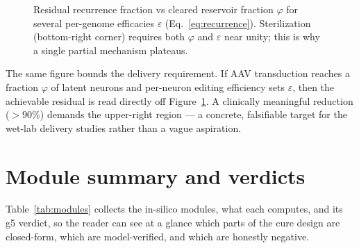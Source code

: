 \documentclass[11pt,a4paper]{article}
\begin{document}
\begin{figure}[h]
\centering
{}
\caption{Residual recurrence fraction vs cleared reservoir fraction $\varphi$ for
several per-genome efficacies $\varepsilon$ (Eq.~\ref{eq:recurrence}). Sterilization
(bottom-right corner) requires both $\varphi$ and $\varepsilon$ near unity; this
is why a single partial mechanism plateaus.}
\label{fig:collapse}
\end{figure}

The same figure bounds the delivery requirement. If AAV transduction reaches a
fraction $\varphi$ of latent neurons and per-neuron editing efficiency sets
$\varepsilon$, then the achievable residual is read directly off
Figure~\ref{fig:collapse}. A clinically meaningful reduction ($>90\%$) demands
the upper-right region --- a concrete, falsifiable target for the wet-lab
delivery studies rather than a vague aspiration.

\section{Module summary and verdicts}
\label{sec:modules}
Table~\ref{tab:modules} collects the in-silico modules, what each computes, and
its g5 verdict, so the reader can see at a glance which parts of the cure design
are closed-form, which are model-verified, and which are honestly negative.
\end{document}
